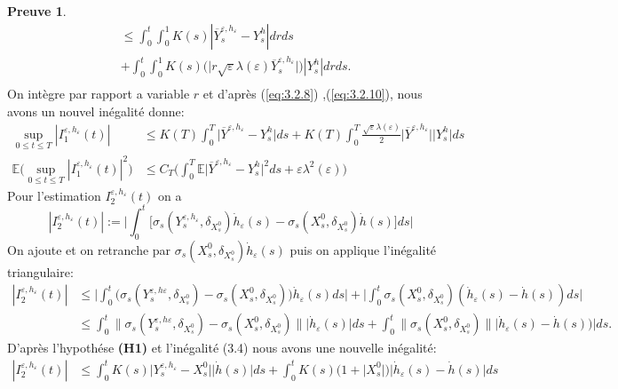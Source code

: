 \documentclass[12pt,a4paper,twoside]{report}%
\theoremstyle{definition}
\newtheorem*{pr}{\textbf{Preuve}}
\numberwithin{equation}{section}
\begin{document}
\begin{pr}
\[\begin{aligned}
	 	&\leq  \int_{0}^{t}\int_{0}^{1}K(s)|\overline{Y}_s^{\varepsilon,h_\varepsilon}-Y_s^h|drds\\&+\int_{0}^{t}\int_{0}^{1}K(s)\Big(\Big|r\sqrt{\varepsilon}\lambda(\varepsilon)\overline{Y}_s^{\varepsilon,h_\varepsilon}\Big|\Big)|Y^h_s|drds.\\
	 \end{aligned}
	 \]
	 On intègre par rapport a variable $r$ et d'après (\ref{eq:3.2.8}) ,(\ref{eq:3.2.10}), nous avons un nouvel inégalité donne:
	 \[
	 \begin{aligned}
	 	\sup_{0 \leq t \leq T}|I_1^{\varepsilon,h_\varepsilon}(t)| &\leq K(T) \int_{0}^{T}\Big|\overline{Y}^{\varepsilon,h_\varepsilon}-Y_s^h\Big|ds +K(T) \int_{0}^{T} \frac{\sqrt{\varepsilon}\lambda(\varepsilon)}{2}\big|\overline{Y}^{\varepsilon,h_\varepsilon}\big|\big|Y_s^h\big|ds\\
	 	\mathbb{E}\Big(\sup_{0 \leq t \leq T}|I_1^{\varepsilon,h_\varepsilon}(t)|^2\Big)&\leq C_T\Big(\int_{0}^{T}\mathbb{E}\Big|\overline{Y}^{\varepsilon,h_\varepsilon}-Y_s^h\Big|^2ds + \varepsilon\lambda^2(\varepsilon)\Big)
	 \end{aligned}
	 \]
	 Pour l'estimation $I_2^{\varepsilon,h_\varepsilon}(t)$ on a
	 \[
	 |I_2^{\varepsilon,h_\varepsilon}(t)| :=\big|\int_{0}^{t}\big[\sigma_s(Y_s^{\varepsilon,h_\varepsilon},\delta_{X_{s}^{0}})\dot{h}_\varepsilon(s) - \sigma_s(X_s^0,\delta_{X_{s}^{0}})\dot{h}(s)\big]ds\Big|
	 \]
	On ajoute et on retranche par $\sigma_s(X_s^0,\delta_{X_{s}^{0}})\dot{h}_\varepsilon(s)$
 puis on applique l'inégalité triangulaire:
 	 \[
 	 \begin{aligned}
 	 |I_2^{\varepsilon,h_\varepsilon}(t)| &\leq \big|\int_{0}^{t}\big(\sigma_{s}(Y_s^{\varepsilon,h\varepsilon},\delta_{X_s^0})-\sigma_s(X_s^0,\delta_{X_{s}^{0}})\big)\dot{h}_\varepsilon(s)ds\big| + \big|\int_{0}^{t}\sigma_{s}(X_s^0,\delta_{X_{s}^{0}})(\dot{h}_\varepsilon(s)-\dot{h}(s))ds\big|\\
 	 &\leq \int_{0}^{t}\big\|\sigma_{s}(Y_s^{\varepsilon,h\varepsilon},\delta_{X_s^0})-\sigma_s(X_s^0,\delta_{X_{s}^{0}})\big\|\big|\dot{h}_\varepsilon(s)\big|ds + \int_{0}^{t}\big\|\sigma_{s}(X_s^0,\delta_{X_{s}^{0}})\big\|\big|\dot{h}_\varepsilon(s)-\dot{h}(s))\big|ds.
 	 \end{aligned}
 	 \]
	 D'après l'hypothése \textbf{(H1)} et l'inégalité (3.4) nous avons une nouvelle inégalité:
	 \[
	 \begin{aligned}
	 	|I_2^{\varepsilon,h_\varepsilon}(t)| &\leq \int_{0}^{t}K(s)\big|Y_s^{\varepsilon,h_\varepsilon}-X_s^0\big|\big|\dot{h}(s)\big|ds+\int_{0}^{t}K(s)\big(1 + \big|X_s^0\big|\big)\big|\dot{h}_\varepsilon(s)-\dot{h}(s)\big|ds\\

\end{aligned}\]
\end{pr}
\end{document}
